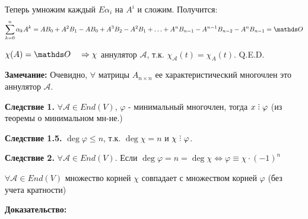 Теперь умножим каждый $E\alpha_i$ на $A^i$ и сложим. Получится:
$$\sum\limits_{k=0}^{n} \alpha_kA^k = AB_0 +A^2B_1 - AB_0 + A^3B_2 - A^2B_1+ \ldots + A^nB_{n-1} - A^{n-1}B_{n-2} -A^nB_{n-1} = \zero$$

$\chi (A) = \zero \quad \Rightarrow \chi  $ аннулятор $\mathcal{A}$, т.к. $\chi_{\mathcal{A}}(t)=\chi_{A}(t)$.
 \hfill Q.E.D.

\textbf{Замечание:} Очевидно, $\forall$ матрицы $A_{n \times n}$ ее характеристический многочлен это аннулятор $\mathcal{A}$.

\textbf{Следствие 1.} $\forall \mathcal{A} \in End(V)$, $\varphi$ - минимальный многочлен, тогда $x \divby \varphi $ (из теоремы о минимальном мн-не.)

\textbf{Следствие 1.5.} $\deg \varphi \leq n$, т.к. $\deg \chi = n$ и $\chi \divby \varphi$.

\textbf{Следствие 2.} $\forall \mathcal{A} \in End(V)$. Если $\deg  \varphi = n = \deg \chi \Leftrightarrow \varphi \equiv \chi \cdot (-1)^n$


$\forall \mathcal{A} \in End(V)$ множество корней $\chi$ совпадает с множеством корней $\varphi$ (без учета кратности)

\textbf{Доказательство:}

